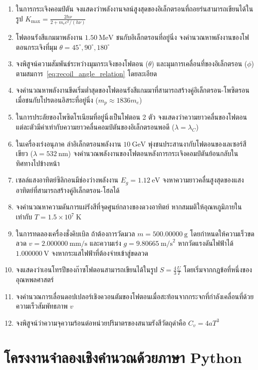 \begin{enumerate}
    \item ในการกระเจิงคอมป์ตัน จงแสดงว่าพลังงานจลน์สูงสุดของอิเล็กตรอนที่ถอยร่นสามารถเขียนได้ในรูป $K_{\max} = \frac{2 h\nu}{2 + m_e c^2 / (h\nu)}$
    \item โฟตอนรังสีแกมมาพลังงาน $1.50~\text{MeV}$ ชนกับอิเล็กตรอนที่อยู่นิ่ง จงคำนวณหาพลังงานของโฟตอนกระเจิงที่มุม $\theta = 45^\circ, 90^\circ, 180^\circ$
    \item จงพิสูจน์ความสัมพันธ์ระหว่างมุมกระเจิงของโฟตอน ($\theta$) และมุมการเคลื่อนที่ของอิเล็กตรอน ($\phi$) ตามสมการ~\eqref{eq:recoil_angle_relation} โดยละเอียด
    \item จงคำนวณหาพลังงานขีดเริ่มต่ำสุดของโฟตอนรังสีแกมมาที่สามารถสร้างคู่อิเล็กตรอน-โพซิตรอน เมื่อชนกับโปรตอนอิสระที่อยู่นิ่ง ($m_p \approx 1836 m_e$)
    \item ในการประลัยของโพซิตโรเนียมที่อยู่นิ่งเป็นโฟตอน 2 ตัว จงแสดงว่าความยาวคลื่นของโฟตอนแต่ละตัวมีค่าเท่ากับความยาวคลื่นคอมป์ตันของอิเล็กตรอนพอดี ($\lambda = \lambda_C$)
    \item ในเครื่องเร่งอนุภาค ลำอิเล็กตรอนพลังงาน $10~\text{GeV}$ พุ่งชนประสานงากับโฟตอนของเลเซอร์สีเขียว ($\lambda = 532~\text{nm}$) จงคำนวณพลังงานของโฟตอนหลังการกระเจิงคอมป์ตันย้อนกลับในทิศทางไปข้างหน้า
    \item เซลล์แสงอาทิตย์ซิลิกอนมีช่องว่างพลังงาน $E_g = 1.12~\text{eV}$ จงหาความยาวคลื่นสูงสุดของแสงอาทิตย์ที่สามารถสร้างคู่อิเล็กตรอน-โฮลได้
    \item จงคำนวณหาความดันการแผ่รังสีที่จุดศูนย์กลางของดวงอาทิตย์ หากสมมติให้อุณหภูมิภายในเท่ากับ $T = 1.5 \times 10^7~\text{K}$
    \item ในการทดลองเครื่องชั่งคิบเบิล ถ้าต้องการวัดมวล $m = 500.00000~\text{g}$ โดยกำหนดให้ความเร็วขดลวด $v = 2.000000~\text{mm/s}$ และความเร่ง $g = 9.80665~\text{m/s}^2$ หากวัดแรงดันไฟฟ้าได้ $1.000000~\text{V}$ จงหากระแสไฟฟ้าที่ต้องจ่ายเข้าสู่ขดลวด
    \item จงแสดงว่าเอนโทรปีของก๊าซโฟตอนสามารถเขียนได้ในรูป $S = \frac{4}{3}\frac{U}{T}$ โดยเริ่มจากกฎข้อที่หนึ่งของอุณหพลศาสตร์
    \item จงคำนวณการเลื่อนดอปเปลอร์เชิงควอนตัมของโฟตอนเมื่อสะท้อนจากกระจกที่กำลังเคลื่อนที่ด้วยความเร็วสัมพัทธภาพ $v$
    \item จงพิสูจน์ว่าความจุความร้อนต่อหน่วยปริมาตรของสนามรังสีวัตถุดำคือ $C_v = 4 a T^3$
\end{enumerate}

\section{โครงงานจำลองเชิงคำนวณด้วยภาษา Python}

